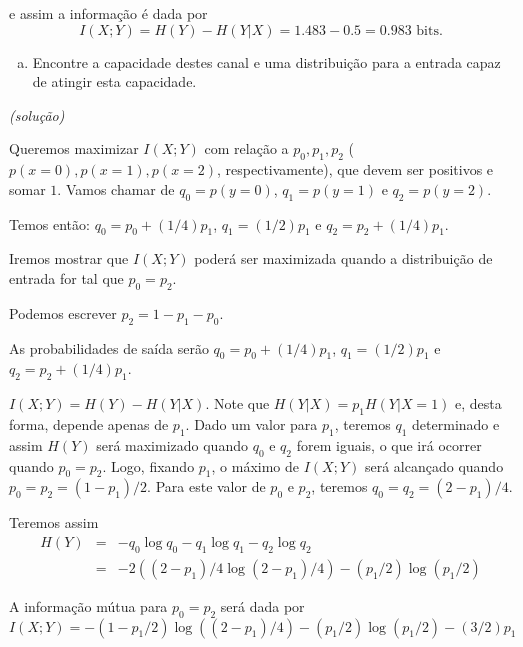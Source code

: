 \begin{frame}[allowframebreaks]
\begin{exercise}
  e assim a informação é dada por
  \begin{equation}
  I(X;Y) = H(Y) - H(Y|X) = 1.483 - 0.5 = 0.983 \text{ bits}.
  \end{equation}

  \exercisebreak

  \begin{enumerate}[c)]
  \item Encontre a capacidade destes canal e uma distribuição para a entrada capaz de atingir esta capacidade.
  \end{enumerate}

  \textit{(solução)}
  
  Queremos maximizar $I(X;Y)$ com relação a $p_0, p_1, p_2$ ($p(x=0), p(x=1), p(x=2)$, respectivamente),
  que devem ser positivos e somar $1$. Vamos chamar de $q_0 = p(y=0)$, $q_1 = p(y=1)$ e $q_2 = p(y=2)$.

  Temos então: $q_0 = p_0 + (1/4)p_1$, $q_1 = (1/2) p_1$ e $q_2 = p_2 + (1/4) p_1$.

  Iremos mostrar que $I(X;Y)$ poderá ser maximizada quando a distribuição de entrada for tal que $p_0=p_2$.
  
  \exercisebreak

  Podemos escrever $p_2 = 1 - p_1 - p_0$.

  As probabilidades de saída serão $q_0 = p_0 + (1/4) p_1$, $q_1 = (1/2) p_1$ e $q_2 = p_2 + (1/4)p_1$.

  $I(X;Y) = H(Y) - H(Y|X)$. Note que $H(Y|X) = p_1 H(Y|X=1)$ e, desta forma, depende apenas de $p_1$.
  Dado um valor para $p_1$, teremos $q_1$ determinado e assim $H(Y)$ será maximizado quando $q_0$ e $q_2$
  forem iguais, o que irá ocorrer quando $p_0 = p_2$. Logo, fixando $p_1$, o máximo de $I(X;Y)$ será alcançado
  quando $p_0 = p_2 = (1-p_1)/2$. Para este valor de $p_0$ e $p_2$, teremos $q_0 = q_2 = (2-p_1)/4$.

  \exercisebreak

  Teremos assim
  \begin{eqnarray}
  H(Y) 	&=& -q_0 \log q_0 - q_1 \log q_1 - q_2 \log q_2 \nonumber \\
	&=& - 2 \left( (2-p_1)/4 \log (2-p_1)/4 \right) - (p_1/2) \log (p_1/2) 
  \end{eqnarray}

  A informação mútua para $p_0 = p_2$ será dada por
  \begin{equation}
  I(X;Y) = - (1-p_1/2) \log ((2-p_1)/4) - (p_1/2) \log (p_1/2) - (3/2) p_1
  \end{equation}


\end{exercise}
\end{frame}
